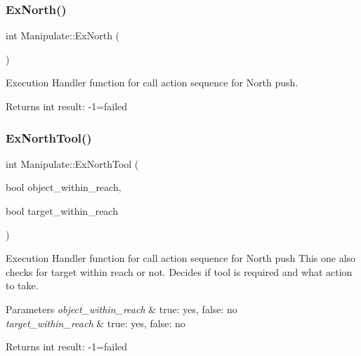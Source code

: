 \subsubsection{\texorpdfstring{Ex\+North()}{ExNorth()}}
{\footnotesize\ttfamily int Manipulate\+::\+Ex\+North (\begin{DoxyParamCaption}{ }\end{DoxyParamCaption})\hspace{0.3cm}{\ttfamily [private]}}



Execution Handler function for call action sequence for North push. 

\begin{DoxyReturn}{Returns}
int result\+: -\/1=failed 
\end{DoxyReturn}
\mbox{\label{structManipulate_afdf5f6d0d34bff3fdfa2f3a2e590ca7f}} 
\subsubsection{\texorpdfstring{Ex\+North\+Tool()}{ExNorthTool()}}
{\footnotesize\ttfamily int Manipulate\+::\+Ex\+North\+Tool (\begin{DoxyParamCaption}\item[{bool}]{object\+\_\+within\+\_\+reach,  }\item[{bool}]{target\+\_\+within\+\_\+reach }\end{DoxyParamCaption})\hspace{0.3cm}{\ttfamily [private]}}



Execution Handler function for call action sequence for North push This one also checks for target within reach or not. Decides if tool is required and what action to take. 


\begin{DoxyParams}{Parameters}
{\em object\+\_\+within\+\_\+reach} & true\+: yes, false\+: no \\
\hline
{\em target\+\_\+within\+\_\+reach} & true\+: yes, false\+: no \\
\hline
\end{DoxyParams}
\begin{DoxyReturn}{Returns}
int result\+: -\/1=failed 
\end{DoxyReturn}
\mbox{\label{structManipulate_ad8c0f3dc7de79a53da885f538354cfd8}} 
